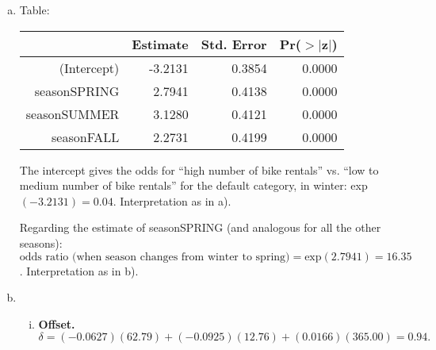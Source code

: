 {\begin{enumerate}[a)]
    and for fall:
    \[
    \text{odds ratio} 
    = \frac{P(y=1\, | \,\texttt{season}=\text{FALL})\,/\,P(y=0\, | \,\texttt{season}=\text{FALL})}{P(y=1\, | \,\texttt{season}=\text{WINTER})\,/\,P(y=0\, | \,\texttt{season}=\text{WINTER})}
    = \frac{50/128}{7/174} = 9.71.
    \]
    
	\textbf{Interpretation:} The chances (the odds) of having "high bike rentals" are $16.35$ times higher in season SPRING compared to the reference category (WINTER).
    As in winter the odds of $y=0$ are $25:1$, this means in spring they are roughly $(25:16):1$, which means roughly $5:3$.
    Similarly, in summer the odds are $22.83$ times higher that in winter, which means that in summer they are close to $1:1$ (since in winter they were $1:25$), so the chances in summer are roughly 50-50.

    \newpage
    
	\item Table:
	\begin{table}[!ht]
		\centering
		\begin{tabular}{rrrr}
			\hline
			& Estimate & Std. Error & Pr($>$$|$z$|$) \\ 
			\hline
			(Intercept) & -3.2131 & 0.3854 & 0.0000 \\ 
			seasonSPRING & 2.7941 & 0.4138 & 0.0000 \\ 
			seasonSUMMER & 3.1280 & 0.4121 & 0.0000 \\ 
			seasonFALL & 2.2731 & 0.4199 & 0.0000 \\ 
			\hline
		\end{tabular}
	\end{table}

	The intercept gives the odds for ``high number of bike rentals'' vs. ``low to medium number of bike rentals'' for the default category, in winter: exp$(-3.2131) = 0.04$. Interpretation as in a).
	
	Regarding the estimate of seasonSPRING (and analogous for all the other seasons): $\text{odds ratio (when season changes from winter to spring)} = \text{exp}(2.7941) =  16.35$. Interpretation as in b).

    \item

    \begin{enumerate}[(i)]
    
        \item\textbf{Offset.}
    $
    \delta=
    (-0.0627)(62.79)
    +(-0.0925)(12.76)
    +(0.0166)(365.00)
    =\boxed{0.94}.
    $
    

\end{enumerate}
\end{enumerate}}
